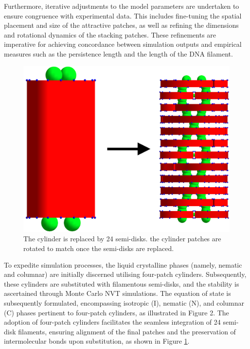 \documentclass[aip,jcp, amsmath, amssymb, reprint]{revtex4-1}
\begin{document}
Furthermore, iterative adjustments to the model parameters are undertaken to ensure congruence with experimental data.
This includes fine-tuning the spatial placement and size of the attractive patches, as well as refining the dimensions
and rotational dynamics of the stacking patches. These refinements are imperative for achieving concordance between
simulation outputs and empirical measures such as the persistence length and the length of the DNA filament. 

\begin{figure}[h!]
\includegraphics[width=0.7\linewidth]{sosti4.png}
\caption{\label{fig:fila} The cylinder is replaced by 24 semi-disks. the cylinder patches are rotated to match once the semi-disks are replaced.}
\end{figure}

To expedite simulation processes, the liquid crystalline phases (namely, nematic and columnar) are initially discerned utilising four-patch cylinders. Subsequently, these cylinders are substituted with filamentous semi-disks, and the stability is ascertained through Monte Carlo NVT simulations. The equation of state is subsequently formulated, encompassing isotropic (I), nematic (N), and columnar (C) phases pertinent to four-patch cylinders, as illustrated in Figure 2. The adoption of four-patch cylinders facilitates the seamless integration of 24 semi-disk filaments, ensuring alignment of the final patches and the preservation of intermolecular bonds upon substitution, as shown in Figure \ref{fig:fila}.
\end{document}
